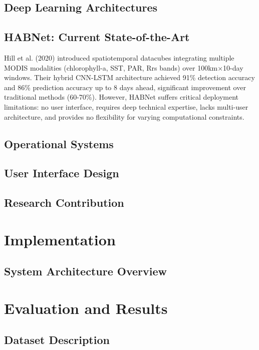 \documentclass[conference]{IEEEtran}
\begin{document}
\subsection{Deep Learning Architectures}


\subsection{HABNet: Current State-of-the-Art}
Hill et al. (2020) introduced spatiotemporal datacubes integrating multiple MODIS modalities (chlorophyll-a, SST, PAR, Rrs bands) over 100km×10-day windows. Their hybrid CNN-LSTM architecture achieved 91\% detection accuracy and 86\% prediction accuracy up to 8 days ahead, significant improvement over traditional methods (60-70\%). However, HABNet suffers critical deployment limitations: no user interface, requires deep technical expertise, lacks multi-user architecture, and provides no flexibility for varying computational constraints.
\subsection{Operational Systems}

\subsection{User Interface Design}

\subsection{Research Contribution}

\section{Implementation}

\subsection{System Architecture Overview}


\section{Evaluation and Results}

\subsection{Dataset Description}
\end{document}
